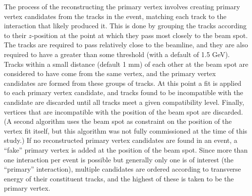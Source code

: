 The process of the reconstructing the primary vertex 
involves creating primary vertex candidates
from the tracks in the event,
matching each track to the interaction
that likely produced it.
This is done by grouping the tracks according 
to their $z$-position at the point at which they pass 
most closely to the beam spot.  
The tracks are required to pass relatively close 
to the beamline, 
and they are also required to have a \pt greater 
than some threshold (with a default of 1.5 GeV).  
Tracks within a small distance (default 1 mm) of each other 
at the beam spot are considered to have come from 
the same vertex, 
and the primary vertex candidates are formed from these 
groups of tracks.  
At this point a fit is applied to each primary vertex candidate, 
and tracks found to be incompatible with the candidate are discarded 
until all tracks meet a given compatibility level.  
Finally, vertices that are incompatible with the position 
of the beam spot are discarded.  
(A second algorithm uses the beam spot as constraint on the 
position of the vertex fit itself, 
but this algorithm was not fully commissioned at the time 
of this study.)  
If no reconstructed primary vertex candidates are found in 
an event, 
a ``fake'' primary vertex is added at the position 
of the beam spot.  
Since more than one interaction per event is possible 
but generally only one is of interest (the ``primary'' interaction), 
multiple candidates are ordered according to transverse energy of 
their constituent tracks, 
and the highest of these is taken to be the primary vertex.  

\clearpage
